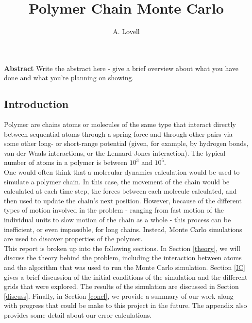 \documentclass{article}
\begin{document}
\title{Polymer Chain Monte Carlo}
\author{A. Lovell}
\maketitle

\noindent \textbf{Abstract}  Write the abstract here - give a brief overview about what you have done and what you're planning on showing.

\begin{multicols}{2}

\section{Introduction}

Polymer are chains atoms or molecules of the same type that interact directly between sequential atoms through a spring force and through other pairs via some other long- or short-range potential (given, for example, by hydrogen bonds, van der Waals interactions, or the Lennard-Jones interaction).  The typical number of atoms in a polymer is between $10^3$ and $10^5$.  \\

One would often think that a molecular dynamics calculation would be used to simulate a polymer chain.  In this case, the movement of the chain would be calculated at each time step, the forces between each molecule calculated, and then used to update the chain's next position.  However, because of the different types of motion involved in the problem - ranging from fast motion of the individual units to slow motion of the chain as a whole - this process can be inefficient, or even impossible, for long chains.  \cite{PhilNotes} Instead, Monte Carlo simulations are used to discover properties of the polymer.  \\

This report is broken up into the following sections.  In Section \ref{theory}, we will discuss the theory behind the problem, including the interaction between atoms and the algorithm that was used to run the Monte Carlo simulation.  Section \ref{IC} gives a brief discussion of the initial conditions of the simulation and the different grids that were explored.  The results of the simulation are discussed in Section \ref{discuss}.  Finally, in Section \ref{concl}, we provide a summary of our work along with progress that could be make to this project in the future.  The appendix also provides some detail about our error calculations.  \\


\end{multicols}
\end{document}
